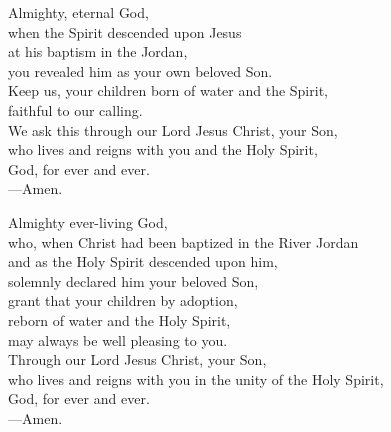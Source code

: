 \prayer

\begin{prayerverse}

Almighty, eternal God,\\
when the Spirit descended upon Jesus\\
at his baptism in the Jordan,\\
you revealed him as your own beloved Son.\\
Keep us, your children born of water and the Spirit,\\
faithful to our calling.\\
We ask this through our Lord Jesus Christ, your Son,\\
who lives and reigns with you and the Holy Spirit,\\
God, for ever and ever.\\
{\color{red}---\thinspace}Amen.

\end{prayerverse}


\begin{prayerverse}

Almighty ever-living God,\\
who, when Christ had been baptized in the River Jordan\\
and as the Holy Spirit descended upon him,\\
solemnly declared him your beloved Son,\\
grant that your children by adoption,\\
reborn of water and the Holy Spirit,\\
may always be well pleasing to you.\\
Through our Lord Jesus Christ, your Son,\\
who lives and reigns with you in the unity of the Holy Spirit,\\
God, for ever and ever.\\
{\color{red}---\thinspace}Amen.

\end{prayerverse}